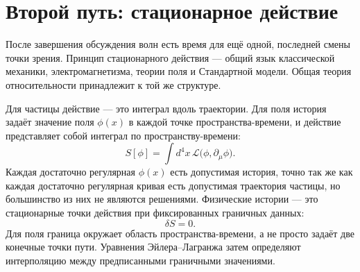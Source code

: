 \begin{classroomqa}
\end{classroomqa}

\begin{classroomqa}
\end{classroomqa}

\section{Второй путь: стационарное действие}

После завершения обсуждения волн есть время для ещё одной, последней смены точки зрения. Принцип стационарного действия — общий язык классической механики, электромагнетизма, теории поля и Стандартной модели. Общая теория относительности принадлежит к той же структуре.

Для частицы действие — это интеграл вдоль траектории. Для поля история задаёт значение поля \(\phi(x)\) в каждой точке пространства-времени, и действие представляет собой интеграл по пространству-времени:
\begin{equation}
 S[\phi]
 =\int d^4x\,
 \mathcal L\bigl(\phi,\partial_\mu\phi\bigr).
 \label{eq:field-action}
\end{equation}
Каждая достаточно регулярная \(\phi(x)\) есть допустимая история, точно так же как каждая достаточно регулярная кривая есть допустимая траектория частицы, но большинство из них не являются решениями. Физические истории — это стационарные точки действия при фиксированных граничных данных:
\begin{equation}
 \delta S=0.
 \label{eq:stationary-action}
\end{equation}
Для поля граница окружает область пространства-времени, а не просто задаёт две конечные точки пути. Уравнения Эйлера--Лагранжа затем определяют интерполяцию между предписанными граничными значениями.

